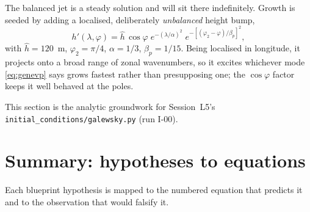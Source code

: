 \documentclass[11pt,a4paper]{article}
\newcommand{\file}[1]{\texttt{\nolinkurl{#1}}}
\begin{document}
The balanced jet is a steady solution and will sit there indefinitely. Growth is
seeded by adding a localised, deliberately \emph{unbalanced} height bump,
%
\begin{equation}
h'(\lambda,\varphi) = \hat h\,\cos\varphi\;
  e^{-(\lambda/\alpha)^2}\;
  e^{-[(\varphi_2-\varphi)/\beta_p]^2} ,
\label{eq:pert}
\end{equation}
%
with $\hat h = 120$~m, $\varphi_2 = \pi/4$, $\alpha = 1/3$, $\beta_p = 1/15$.
Being localised in longitude, it projects onto a broad range of zonal
wavenumbers, so it excites whichever mode \eqref{eq:genevp} says grows fastest
rather than presupposing one; the $\cos\varphi$ factor keeps it well behaved at
the poles.

This section is the analytic groundwork for Session~L5's
\file{initial_conditions/galewsky.py} (run I-00).

\section{Summary: hypotheses to equations}
\label{sec:summary}

Each blueprint hypothesis is mapped to the numbered equation that predicts it and
to the observation that would falsify it.
\end{document}
